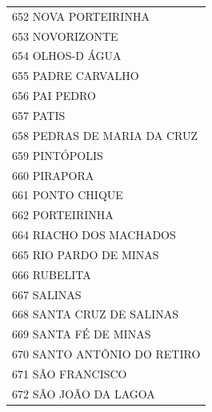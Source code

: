 \documentclass{article}
\begin{document}
\begin{longtable}[c]{m{18cm}}
\multicolumn{1}{l}{ \hspace{2em} 652 NOVA PORTEIRINHA } \\
\multicolumn{1}{l}{ \hspace{2em} 653 NOVORIZONTE } \\
\multicolumn{1}{l}{ \hspace{2em} 654 OLHOS-D ÁGUA } \\
\multicolumn{1}{l}{ \hspace{2em} 655 PADRE CARVALHO } \\
\multicolumn{1}{l}{ \hspace{2em} 656 PAI PEDRO } \\
\multicolumn{1}{l}{ \hspace{2em} 657 PATIS } \\
\multicolumn{1}{l}{ \hspace{2em} 658 PEDRAS DE MARIA DA CRUZ } \\
\multicolumn{1}{l}{ \hspace{2em} 659 PINTÓPOLIS } \\
\multicolumn{1}{l}{ \hspace{2em} 660 PIRAPORA } \\
\multicolumn{1}{l}{ \hspace{2em} 661 PONTO CHIQUE } \\
\multicolumn{1}{l}{ \hspace{2em} 662 PORTEIRINHA } \\
\multicolumn{1}{l}{ \hspace{2em} 664 RIACHO DOS MACHADOS } \\
\multicolumn{1}{l}{ \hspace{2em} 665 RIO PARDO DE MINAS } \\
\multicolumn{1}{l}{ \hspace{2em} 666 RUBELITA } \\
\multicolumn{1}{l}{ \hspace{2em} 667 SALINAS } \\
\multicolumn{1}{l}{ \hspace{2em} 668 SANTA CRUZ DE SALINAS } \\
\multicolumn{1}{l}{ \hspace{2em} 669 SANTA FÉ DE MINAS } \\
\multicolumn{1}{l}{ \hspace{2em} 670 SANTO ANTÔNIO DO RETIRO } \\
\multicolumn{1}{l}{ \hspace{2em} 671 SÃO FRANCISCO } \\
\multicolumn{1}{l}{ \hspace{2em} 672 SÃO JOÃO DA LAGOA } \\

\end{longtable}
\end{document}
